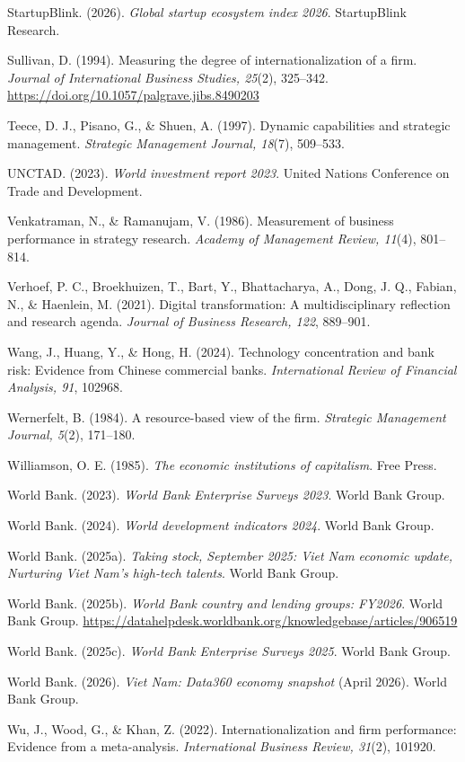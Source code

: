 \documentclass[
  a4paper,
  13pt]{extreport}
\begin{document}
StartupBlink. (2026). \emph{Global startup ecosystem index 2026}.
StartupBlink Research.

Sullivan, D. (1994). Measuring the degree of internationalization of a
firm. \emph{Journal of International Business Studies, 25}(2), 325--342.
\url{https://doi.org/10.1057/palgrave.jibs.8490203}

Teece, D. J., Pisano, G., \& Shuen, A. (1997). Dynamic capabilities and
strategic management. \emph{Strategic Management Journal, 18}(7),
509--533.

UNCTAD. (2023). \emph{World investment report 2023}. United Nations
Conference on Trade and Development.

Venkatraman, N., \& Ramanujam, V. (1986). Measurement of business
performance in strategy research. \emph{Academy of Management Review,
11}(4), 801--814.

Verhoef, P. C., Broekhuizen, T., Bart, Y., Bhattacharya, A., Dong, J.
Q., Fabian, N., \& Haenlein, M. (2021). Digital transformation: A
multidisciplinary reflection and research agenda. \emph{Journal of
Business Research, 122}, 889--901.

Wang, J., Huang, Y., \& Hong, H. (2024). Technology concentration and
bank risk: Evidence from Chinese commercial banks. \emph{International
Review of Financial Analysis, 91}, 102968.

Wernerfelt, B. (1984). A resource-based view of the firm.
\emph{Strategic Management Journal, 5}(2), 171--180.

Williamson, O. E. (1985). \emph{The economic institutions of
capitalism}. Free Press.

World Bank. (2023). \emph{World Bank Enterprise Surveys 2023}. World
Bank Group.

World Bank. (2024). \emph{World development indicators 2024}. World Bank
Group.

World Bank. (2025a). \emph{Taking stock, September 2025: Viet Nam
economic update, Nurturing Viet Nam's high-tech talents}. World Bank
Group.

World Bank. (2025b). \emph{World Bank country and lending groups:
FY2026}. World Bank Group.
\url{https://datahelpdesk.worldbank.org/knowledgebase/articles/906519}

World Bank. (2025c). \emph{World Bank Enterprise Surveys 2025}. World
Bank Group.

World Bank. (2026). \emph{Viet Nam: Data360 economy snapshot} (April
2026). World Bank Group.

Wu, J., Wood, G., \& Khan, Z. (2022). Internationalization and firm
performance: Evidence from a meta-analysis. \emph{International Business
Review, 31}(2), 101920.
\end{document}
